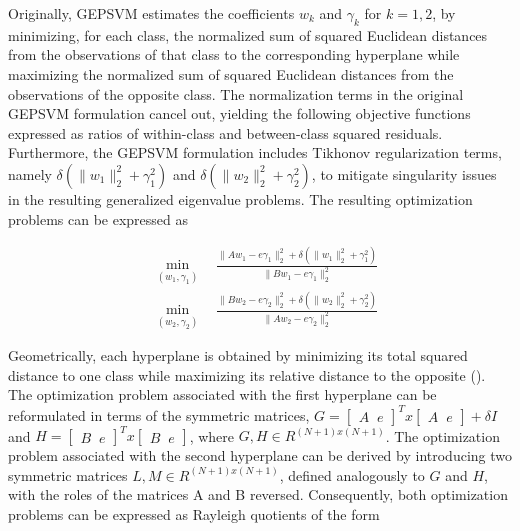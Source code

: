 \documentclass[12pt]{report} %
\begin{document}
Originally, GEPSVM estimates the coefficients $w_k$ and $\gamma_k$ for $k = 1,2$, by minimizing, for each class, the normalized sum of squared Euclidean distances from the observations of that class to the corresponding hyperplane while maximizing the normalized sum of squared Euclidean distances from the observations of the opposite class. The normalization terms in the original GEPSVM formulation cancel out, yielding the following objective functions expressed as ratios of within-class and between-class squared residuals. Furthermore, the GEPSVM formulation includes Tikhonov regularization terms, namely $\delta(\|w_1\|_2^{2}+\gamma_1^{2})$ and $\delta(\|w_2\|_2^{2}+\gamma_2^{2})$, to mitigate singularity issues in the resulting generalized eigenvalue problems. The resulting optimization problems can be expressed as

\begin{subequations}
\begin{align}
& \min_{(w_1,\gamma_1)} \quad \frac{\|Aw_1-e\gamma_1\|_2^{2} + \delta(\|w_1\|_2^{2}+\gamma_1^{2})}{\|Bw_1 -e\gamma_1\|_2^{2}} \\
& \min_{(w_2,\gamma_2)} \quad \frac{\|Bw_2-e\gamma_2\|_2^{2} + \delta(\|w_2\|_2^{2}+\gamma_2^{2})}{\|Aw_2 -e\gamma_2\|_2^{2}}
\label{eq:gepsvm}
\end{align}
\end{subequations}

Geometrically, each hyperplane is obtained by minimizing its total squared distance to one class while maximizing its relative distance to the opposite (\cite{mangasarian2006multisurface}). The optimization problem associated with the first hyperplane can be reformulated in terms of the symmetric matrices, $G = \begin{bmatrix} A\;\;e \end{bmatrix}^{T} x \begin{bmatrix} A\;\;e\end{bmatrix} + \delta I$ and $H = \begin{bmatrix} B\;\;e \end{bmatrix}^{T} x \begin{bmatrix} B\;\;e \end{bmatrix}$, where $G, H \in R^{(N+1)x(N+1)}$. The optimization problem associated with the second hyperplane can be derived by introducing two symmetric matrices $L, M \in R^{(N+1)x(N+1)}$, defined analogously to $G$ and $H$, with the roles of the matrices A and B reversed. Consequently, both optimization problems can be expressed as Rayleigh quotients of the form
\end{document}
